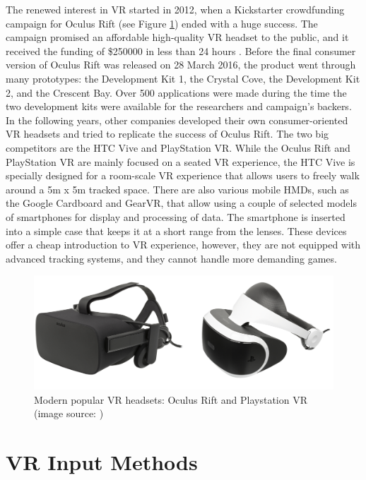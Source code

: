 The renewed interest in VR started in 2012, when a Kickstarter crowdfunding campaign for Oculus Rift (see Figure \ref{fig:CONTROLLERS}) ended with a huge success. The campaign promised an affordable high-quality VR headset to the public, and it received the funding of \$250000 in less than 24 hours \cite{VR_TECHNOLOGY}. Before the final consumer version of Oculus Rift was released on 28 March 2016, the product went through many prototypes: the Development Kit 1, the Crystal Cove, the Development Kit 2, and the Crescent Bay. Over 500 applications were made during the time the two development kits were available for the researchers and campaign's backers. In the following years, other companies developed their own consumer-oriented VR headsets and tried to replicate the success of Oculus Rift. The two big competitors are the HTC Vive and PlayStation VR. While the Oculus Rift and PlayStation VR are mainly focused on a seated VR experience, the HTC Vive is specially designed for a room-scale VR experience that allows users to freely walk around a 5m x 5m tracked space. There are also various mobile HMDs, such as the Google Cardboard and GearVR, that allow using a couple of selected models of smartphones for display and processing of data. The smartphone is inserted into a simple case that keeps it at a short range from the lenses. These devices offer a cheap introduction to VR experience, however, they are not equipped with advanced tracking systems, and they cannot handle more demanding games.

\begin{figure}[th]
\centering
\includegraphics[width=1\textwidth]{img/headsets.png}
\caption{Modern popular VR headsets: Oculus Rift and Playstation VR (image source: \cite{OCULUS_HEADSET}\cite{PSVR_HEADSET})}
\label{fig:CONTROLLERS}
\end{figure}

\section{VR Input Methods}

